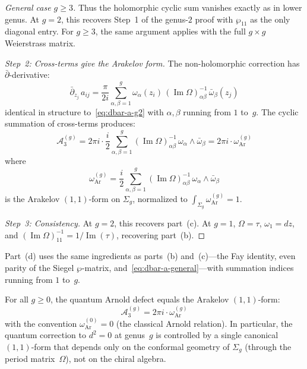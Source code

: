 \begin{proof}[General case $g \geq 3$]
Thus the holomorphic cyclic sum vanishes exactly as in lower genus.
At $g = 2$, this recovers Step~1 of the genus-$2$ proof with
$\wp_{11}$ as the only diagonal entry.  For $g \geq 3$, the same
argument applies with the full $g \times g$ Weierstrass matrix.

\emph{Step~2: Cross-terms give the Arakelov form.}
The non-holomorphic correction has $\bar\partial$-derivative:
\begin{equation}\label{eq:dbar-a-general}
\bar\partial_{z_j}\, a_{ij}
= \frac{\pi}{2i} \sum_{\alpha,\beta=1}^{g}
  \omega_\alpha(z_i)\,(\operatorname{Im}\Omega)^{-1}_{\alpha\beta}\,
  \bar\omega_\beta(z_j)
\end{equation}
identical in structure to~\eqref{eq:dbar-a-g2} with
$\alpha,\beta$ running from $1$ to~$g$.  The cyclic summation
of cross-terms produces:
\begin{equation}\label{eq:arnold-general-result}
\mathcal{A}_3^{(g)} = 2\pi i \cdot
\frac{i}{2}\sum_{\alpha,\beta=1}^{g}
  (\operatorname{Im}\Omega)^{-1}_{\alpha\beta}\,
  \omega_\alpha \wedge \bar\omega_\beta
= 2\pi i \cdot \omega_{\mathrm{Ar}}^{(g)}
\end{equation}
where
\begin{equation}\label{eq:arakelov-general}
\omega_{\mathrm{Ar}}^{(g)}
= \frac{i}{2}\sum_{\alpha,\beta=1}^{g}
  (\operatorname{Im}\Omega)^{-1}_{\alpha\beta}\,
  \omega_\alpha \wedge \bar\omega_\beta
\end{equation}
is the Arakelov $(1,1)$-form on $\Sigma_g$, normalized to
$\int_{\Sigma_g} \omega_{\mathrm{Ar}}^{(g)} = 1$.

\emph{Step~3: Consistency.}
At $g = 2$, this recovers part~(c).  At $g = 1$,
$\Omega = \tau$, $\omega_1 = dz$, and
$(\operatorname{Im}\Omega)^{-1}_{11} = 1/\operatorname{Im}(\tau)$,
recovering part~(b).
\end{proof}

\begin{remark}
Part~(d) uses the same ingredients as parts~(b) and~(c)---the Fay identity, even parity of the Siegel $\wp$-matrix, and~\eqref{eq:dbar-a-general}---with summation indices running from $1$ to~$g$.
\end{remark}

\begin{corollary}
\label{cor:universal-arakelov}
For all $g \geq 0$, the quantum Arnold defect equals the Arakelov
$(1,1)$-form:
\begin{equation}\label{eq:universal-arakelov}
\mathcal{A}_3^{(g)} = 2\pi i \cdot \omega_{\mathrm{Ar}}^{(g)}
\end{equation}
with the convention $\omega_{\mathrm{Ar}}^{(0)} = 0$ (the classical
Arnold relation).  In particular, the quantum correction to
$d^2 = 0$ at genus~$g$ is controlled by a single canonical
$(1,1)$-form that depends only on the conformal geometry of
$\Sigma_g$ (through the period matrix~$\Omega$), not on the
chiral algebra.
\end{corollary}


